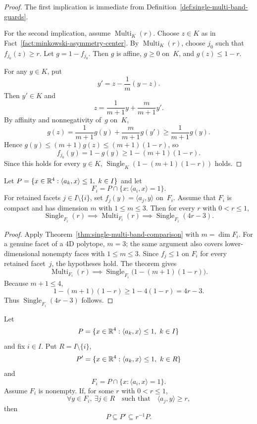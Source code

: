 \begin{proof}
The first implication is immediate from
Definition~\ref{def:single-multi-band-guards}.

For the second implication, assume $\operatorname{Multi}_K(r)$.
Choose $z\in K$ as in Fact~\ref{fact:minkowski-asymmetry-center}. By
$\operatorname{Multi}_K(r)$, choose $j_0$ such that $f_{j_0}(z)\geq r$.
Let $g=1-f_{j_0}$. Then $g$ is affine, $g\geq 0$ on~$K$, and
$g(z)\leq 1-r$.

For any $y\in K$, put
\[
  y' = z-\frac{1}{m}(y-z).
\]
Then $y'\in K$ and
\[
  z = \frac{1}{m+1}y + \frac{m}{m+1}y'.
\]
By affinity and nonnegativity of~$g$ on~$K$,
\[
  g(z)
  = \frac{1}{m+1}g(y) + \frac{m}{m+1}g(y')
  \geq \frac{1}{m+1}g(y).
\]
Hence $g(y)\leq (m+1)g(z)\leq (m+1)(1-r)$, so
\[
  f_{j_0}(y)
  = 1-g(y)
  \geq 1-(m+1)(1-r).
\]
Since this holds for every $y\in K$,
$\operatorname{Single}_K(1-(m+1)(1-r))$ holds.
\end{proof}

\begin{unverified}
\begin{corollary}
\label{cor:four-dimensional-facet-band-comparison}
Let $P=\{x\in\mathbb{R}^4:\langle a_k,x\rangle\leq 1,\ k\in I\}$ and
let
\[
  F_i=P\cap\{x:\langle a_i,x\rangle=1\}.
\]
For retained facets $j\in I\setminus\{i\}$, set
$f_j(y)=\langle a_j,y\rangle$ on~$F_i$.
Assume that $F_i$ is compact and has dimension $m$ with $1\leq m\leq 3$.
Then for every $r$ with $0<r\leq 1$,
\[
  \operatorname{Single}_{F_i}(r)
  \implies
  \operatorname{Multi}_{F_i}(r)
  \implies
  \operatorname{Single}_{F_i}(4r-3).
\]
\end{corollary}
\end{unverified}

\begin{proof}
Apply Theorem~\ref{thm:single-multi-band-comparison} with
$m=\dim F_i$. For a genuine facet of a 4D polytope, $m=3$; the same argument
also covers lower-dimensional nonempty faces with $1\leq m\leq 3$.
Since $f_j\leq 1$ on $F_i$ for every retained facet~$j$,
the hypotheses hold. The theorem gives
\[
  \operatorname{Multi}_{F_i}(r)
  \implies
  \operatorname{Single}_{F_i}\bigl(1-(m+1)(1-r)\bigr).
\]
Because $m+1\leq 4$,
\[
  1-(m+1)(1-r)\geq 1-4(1-r)=4r-3.
\]
Thus $\operatorname{Single}_{F_i}(4r-3)$ follows.
\end{proof}

\begin{unverified}
\begin{theorem}
\label{thm:multi-band-guard-removal-bound}
Let
\[
  P=\{x\in\mathbb{R}^4:\langle a_k,x\rangle\leq 1,\ k\in I\}
\]
and fix $i\in I$. Put $R=I\setminus\{i\}$,
\[
  P'=\{x\in\R^4:\langle a_k,x\rangle\leq 1,\ k\in R\}
\]
and
\[
  F_i=P\cap\{x:\langle a_i,x\rangle=1\}.
\]
Assume $F_i$ is nonempty. If, for some $r$ with $0<r\leq 1$,
\[
  \forall y\in F_i,\ \exists j\in R
  \quad\text{such that}\quad
  \langle a_j,y\rangle\geq r,
\]
then
\[
  P\subseteq P'\subseteq r^{-1}P.
\]
\end{theorem}
\end{unverified}

